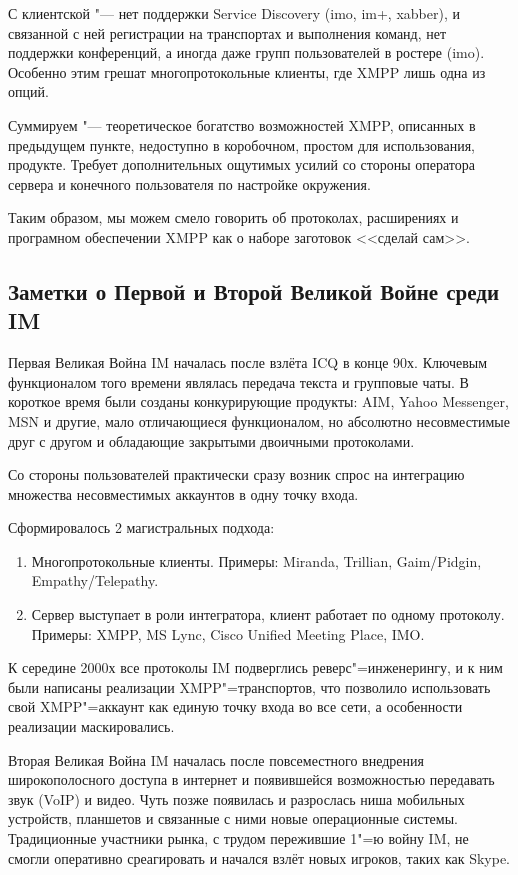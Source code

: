\documentclass[10pt, a5paper]{article}
\begin{document}
С клиентской "--- нет поддержки Service Discovery (imo, im+, \linebreak xabber), и связанной с ней регистрации на транспортах и выполнения команд, нет поддержки конференций, а иногда даже групп пользователей в ростере (imo). Особенно этим грешат многопротокольные клиенты, где XMPP лишь одна из опций.

Суммируем "--- теоретическое богатство возможностей XMPP, \linebreak описанных в предыдущем пункте, недоступно в коробочном, простом для использования, продукте. Требует дополнительных ощутимых усилий со стороны оператора сервера и конечного пользователя по настройке окружения.

Таким образом, мы можем смело говорить об протоколах, расширениях  и програмном обеспечении XMPP как о наборе заготовок <<сделай сам>>.

\subsection*{Заметки о Первой и Второй Великой Войне среди IM}

Первая Великая Война IM началась после взлёта ICQ в конце 90х. Ключевым функционалом того времени являлась передача текста и групповые чаты.  В короткое время были созданы конкурирующие продукты: AIM, Yahoo Messenger, MSN и другие, мало отличающиеся функционалом, но абсолютно несовместимые друг с другом и обладающие закрытыми двоичными протоколами.

Со стороны пользователей практически сразу возник спрос на интеграцию множества несовместимых аккаунтов в одну точку входа.

Сформировалось 2 магистральных подхода:

\begin{enumerate}
  \item Многопротокольные клиенты. Примеры: Miranda, Trillian, Gaim/Pidgin, Empathy/Telepathy.
  \item Сервер выступает в роли интегратора, клиент работает по одному протоколу. Примеры: XMPP, MS Lync, Cisco Unified Meeting Place, IMO.
\end{enumerate}

К середине 2000х все  протоколы IM подверглись реверс"=инженерингу, и к ним были написаны реализации XMPP"=транспортов, что позволило использовать свой XMPP"=аккаунт как единую точку входа во все сети, а особенности реализации маскировались.

Вторая Великая Война IM началась после повсеместного внедрения широкополосного доступа в интернет и появившейся возможностью передавать звук (VoIP) и видео. Чуть позже появилась и разрослась ниша мобильных устройств, планшетов и связанные с ними новые операционные системы. Традиционные участники рынка,  с трудом пережившие 1"=ю войну IM, не смогли оперативно среагировать и начался взлёт новых игроков, таких как Skype.
\end{document}

